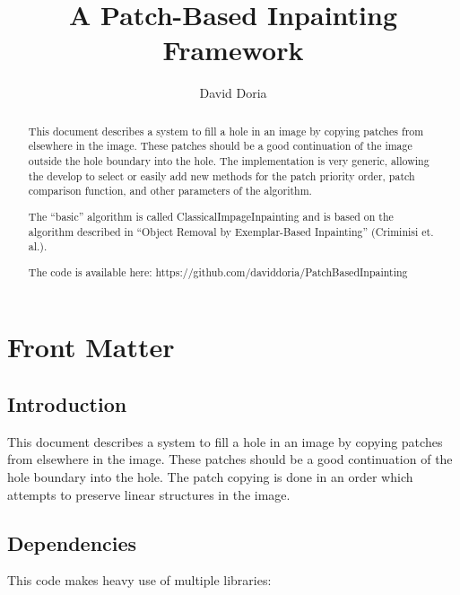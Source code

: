 \documentclass{InsightArticle}
\title{A Patch-Based Inpainting Framework}
\author{David Doria}
\newcommand{\IJhandlerIDnumber}{3250}
\begin{document}
\IJhandlefooter{\IJhandlerIDnumber}


\ifpdf
\else
\fi


\maketitle


\ifhtml
\chapter*{Front Matter\label{front}}
\fi

\begin{abstract}
\noindent
This document describes a system to fill a hole in an image by copying patches from elsewhere in the image. These patches should be a good continuation of the image outside the hole boundary into the hole. The implementation is very generic, allowing the develop to select or easily add new methods for the patch priority order, patch comparison function, and other parameters of the algorithm.

The ``basic'' algorithm is called ClassicalImpageInpainting and is based on the algorithm described in ``Object Removal by Exemplar-Based Inpainting'' (Criminisi et. al.).

The code is available here:
https://github.com/daviddoria/PatchBasedInpainting

\end{abstract}

\IJhandlenote{\IJhandlerIDnumber}

\tableofcontents
\section{Introduction}
This document describes a system to fill a hole in an image by copying patches from elsewhere in the image. These patches should be a good continuation of the hole boundary into the hole. The patch copying is done in an order which attempts to preserve linear structures in the image.

\section{Dependencies}
This code makes heavy use of multiple libraries:
\end{document}
